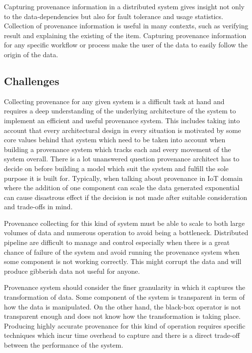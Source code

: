 Capturing provenance information in a distributed system gives insight not only to the data-dependencies but also for fault tolerance and usage statistics. Collection of provenance information is useful in many contexts, such as verifying result and explaining the existing of the item. Capturing provenance information for any specific workflow or process make the user of the data to easily follow the origin of the data. 


\subsection{Challenges}
Collecting provenance for any given system is a difficult task at hand and requires a deep understanding of the underlying architecture of the system to implement an efficient and useful provenance system. This includes taking into account that every architectural design in every situation is motivated by some core values behind that system which need to be taken into account when building a provenance system which tracks each and every movement of the system overall. There is a lot unanswered question provenance architect has to decide on before building a model which suit the system and fulfill the sole purpose it is built for. Typically, when talking about provenance in IoT domain where the addition of one component can scale the data generated exponential can cause disastrous effect if the decision is not made after suitable consideration and trade-offs in mind. 

Provenance collecting for this kind of system must be able to scale to both large volumes of data and numerous operation to avoid being a bottleneck. Distributed pipeline are difficult to manage and control especially when there is a great chance of failure of the system and avoid running the provenance system when some component is not working correctly. This might corrupt the data and will produce gibberish data not useful for anyone.

Provenance system should consider the finer granularity in which it captures the transformation of data. Some component of the system is transparent in term of how the data is manipulated.  On the other hand, the black-box operator is not transparent enough and does not know how the transformation is taking place. Producing highly accurate provenance for this kind of operation requires specific techniques which incur time overhead to capture and there is a direct trade-off between the performance of the system.



